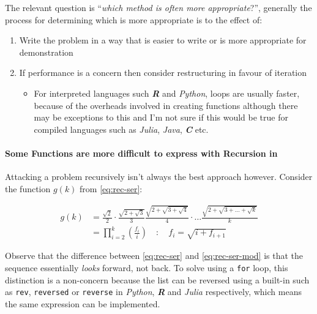 \documentclass[11pt]{article}
\begin{document}
The relevant question is ``\emph{which method is often more appropriate}?'', generally
the process for determining which is more appropriate is to the effect of:

\begin{enumerate}
\item Write the problem in a way that is easier to write or is more
appropriate for demonstration
\item If performance is a concern then consider restructuring in favour of iteration
\begin{itemize}
\item For interpreted languages such \textbf{\emph{R}} and \emph{Python}, loops are usually
faster, because of the overheads involved in creating functions
\cite{smolarskiMath60Notes2000} although there may be exceptions to this and
I'm not sure if this would be true for compiled languages such as \emph{Julia},
\emph{Java}, \textbf{\emph{C}} etc.
\end{itemize}
\end{enumerate}

\paragraph{Some Functions are more difficult to express with Recursion in}
\label{some-functions-are-more-difficult-to-express-with-recursion-in-python}
Attacking a problem recursively isn't always the best approach however. Consider the function \(g\left( k \right)\) from \eqref{eq:rec-ser}:


\begin{align}
    g\left( k \right) &=  \frac{\sqrt{2} }{2} \cdot   \frac{\sqrt{2+  \sqrt{3}}  }{3} \frac{\sqrt{2 +  \sqrt{3 +  \sqrt{4} } } }{4} \cdot  \ldots \frac{\sqrt{2 +  \sqrt{3 +  \ldots +  \sqrt{k} } } }{k} \nonumber \\
    &=  \prod^k_{i = 2} \left( \frac{f_i}{i}  \right) \quad : \quad f_{i} = \sqrt{i +  f_{i+1}} \nonumber
\end{align}

Observe that the difference between \eqref{eq:rec-ser} and \eqref{eq:rec-ser-mod} is
that the sequence essentially \emph{looks} forward, not back. To solve using a \texttt{for}
loop, this distinction is a non-concern because the list can be reversed using a built-in
such as \texttt{rev}, \texttt{reversed} or \texttt{reverse} in \emph{Python}, \textbf{\emph{R}} and \emph{Julia}
respectively, which means the same expression can be implemented.
\end{document}

